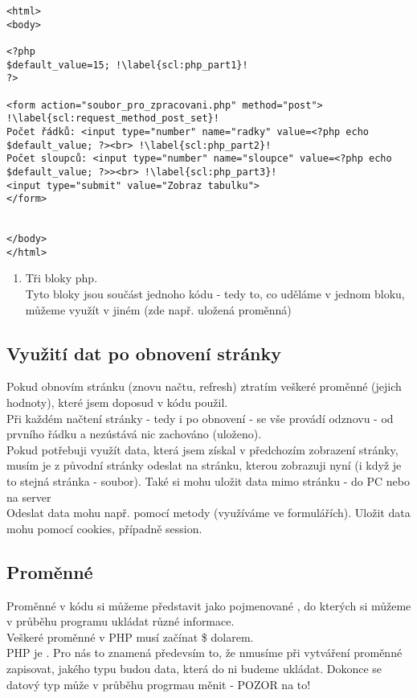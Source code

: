 \begin{minipage}[t]{.45\textwidth}
\begin{code}
\begin{verbatim}
<html>
<body>

<?php
$default_value=15; !\label{scl:php_part1}!
?>

<form action="soubor_pro_zpracovani.php" method="post"> !\label{scl:request_method_post_set}!
Počet řádků: <input type="number" name="radky" value=<?php echo $default_value; ?><br> !\label{scl:php_part2}!
Počet sloupců: <input type="number" name="sloupce" value=<?php echo $default_value; ?>><br> !\label{scl:php_part3}!
<input type="submit" value="Zobraz tabulku">
</form>


</body>
</html> 
\end{verbatim}

\label{code:php_divide_code}
\end{code}
\end{minipage}
\begin{minipage}[t]{.45\textwidth}
\vspace{5cm}
\begin{enumerate}
\item[ř. \ref{scl:php_part1}, \ref{scl:php_part2}, \ref{scl:php_part3}:] Tři bloky php.\\Tyto bloky jsou součást jednoho kódu - tedy to, co uděláme v jednom bloku, můžeme využít v jiném (zde např. uložená proměnná)
\end{enumerate}
\end{minipage}

\subsection{Využití dat po obnovení stránky}
Pokud obnovím stránku (znovu načtu, refresh) ztratím veškeré proměnné (jejich hodnoty), které jsem doposud v kódu použil.\\
Při každém načtení stránky - tedy i po obnovení - se vše provádí odznovu - od prvního řádku a nezústává nic zachováno (uloženo).\\
Pokud potřebuji využít data, která jsem získal v předchozím zobrazení stránky, musím je z původní stránky odeslat na stránku, kterou zobrazuji nyní (i když je to stejná stránka - soubor). Také si mohu uložit data mimo stránku - do PC nebo na server\\
Odeslat data mohu např. pomocí metody  (využíváme ve formulářích). Uložit data mohu pomocí cookies, případně session.

\subsection{Proměnné}
Proměnné v kódu si můžeme představit jako pojmenované , do kterých si můžeme v průběhu programu ukládat různé informace.\\
Veškeré proměnné v PHP musí začínat \$ dolarem.\\
PHP je . Pro nás to znamená předevsím to, že nmusíme při vytváření proměnné zapisovat, jakého typu budou data, která do ni budeme ukládat. Dokonce se datový typ může v průběhu progrmau měnit - POZOR na to!